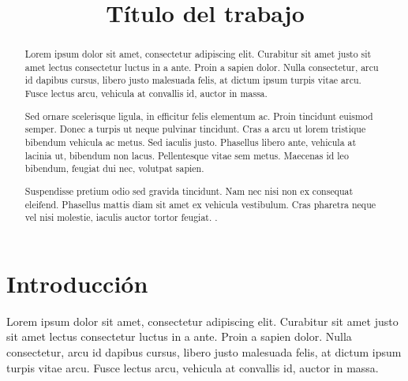 \documentclass[conference]{IEEEtran}
\begin{document}
\title{Título del trabajo}

\author{
}

\maketitle

\begin{abstract}
Lorem ipsum dolor sit amet, consectetur adipiscing elit. Curabitur sit amet justo sit amet lectus consectetur luctus in a ante. Proin a sapien dolor. Nulla consectetur, arcu id dapibus cursus, libero justo malesuada felis, at dictum ipsum turpis vitae arcu. Fusce lectus arcu, vehicula at convallis id, auctor in massa.

Sed ornare scelerisque ligula, in efficitur felis elementum ac. Proin tincidunt euismod semper. Donec a turpis ut neque pulvinar tincidunt. Cras a arcu ut lorem tristique bibendum vehicula ac metus. Sed iaculis justo. Phasellus libero ante, vehicula at lacinia ut, bibendum non lacus. Pellentesque vitae sem metus. Maecenas id leo bibendum, feugiat dui nec, volutpat sapien.
 
Suspendisse pretium odio sed gravida tincidunt. Nam nec nisi non ex consequat eleifend. Phasellus mattis diam sit amet ex vehicula vestibulum. Cras pharetra neque vel nisi molestie, iaculis auctor tortor feugiat.
.
\end{abstract}


\section{Introducción}
\label{sec:intro}
Lorem ipsum dolor sit amet, consectetur adipiscing elit. Curabitur sit amet justo sit amet lectus consectetur luctus in a ante. Proin a sapien dolor. Nulla consectetur, arcu id dapibus cursus, libero justo malesuada felis, at dictum ipsum turpis vitae arcu. Fusce lectus arcu, vehicula at convallis id, auctor in massa.
\end{document}
